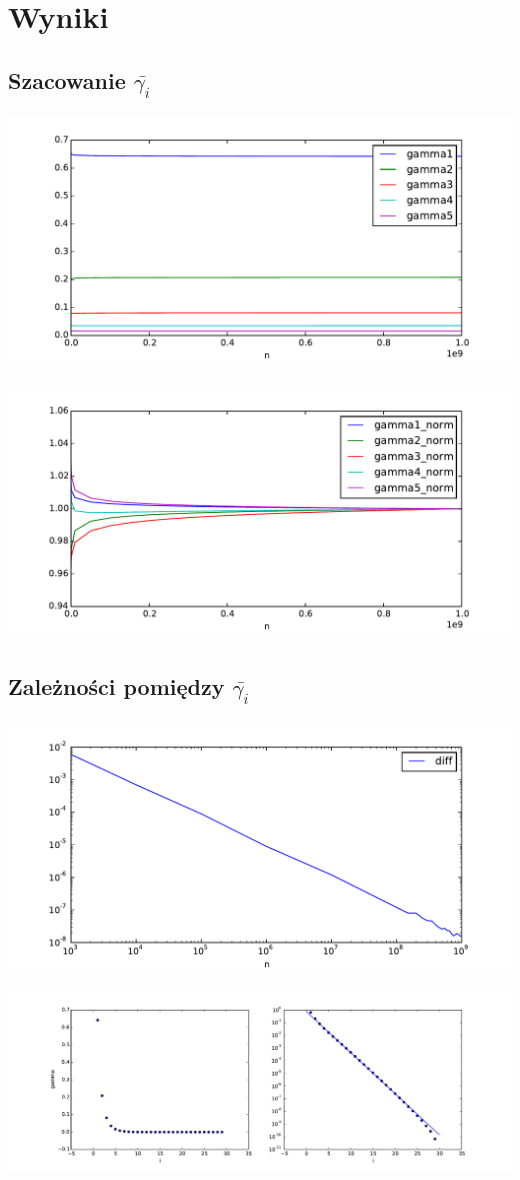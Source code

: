 \documentclass{report}
\begin{document}
\chapter*{Wyniki}

\section*{Szacowanie $\bar{\gamma_i}$}

\begin{center} \includegraphics[width=0.75 \linewidth]{0} \end{center}
\begin{center} \includegraphics[width=0.75 \linewidth]{1} \end{center}

\section*{Zależności pomiędzy $\bar{\gamma_i}$}

\begin{center} \includegraphics[width=0.75 \linewidth]{2} \end{center}
\begin{center} \includegraphics[width=1 \linewidth]{3} \end{center}
\end{document}
